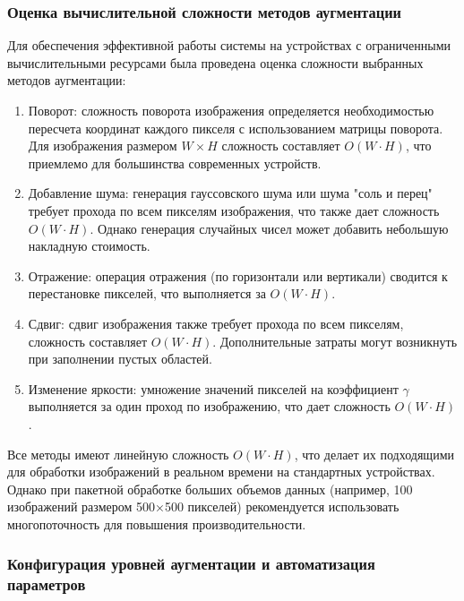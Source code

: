

\subsubsection{Оценка вычислительной сложности методов аугментации}

Для обеспечения эффективной работы системы на устройствах с ограниченными вычислительными ресурсами была проведена оценка сложности выбранных методов аугментации:

\begin{enumerate}
	\item Поворот: сложность поворота изображения определяется необходимостью пересчета координат каждого пикселя с использованием матрицы поворота. Для изображения размером $W \times H$ сложность составляет $O(W \cdot H)$, что приемлемо для большинства современных устройств.
	\item Добавление шума: генерация гауссовского шума или шума "соль и перец" требует прохода по всем пикселям изображения, что также дает сложность $O(W \cdot H)$. Однако генерация случайных чисел может добавить небольшую накладную стоимость.
	\item Отражение: операция отражения (по горизонтали или вертикали) сводится к перестановке пикселей, что выполняется за $O(W \cdot H)$.
	\item Сдвиг: сдвиг изображения также требует прохода по всем пикселям, сложность составляет $O(W \cdot H)$. Дополнительные затраты могут возникнуть при заполнении пустых областей.
	\item Изменение яркости: умножение значений пикселей на коэффициент $\gamma$ выполняется за один проход по изображению, что дает сложность $O(W \cdot H)$.
\end{enumerate}

Все методы имеют линейную сложность $O(W \cdot H)$, что делает их подходящими для обработки изображений в реальном времени на стандартных устройствах. Однако при пакетной обработке больших объемов данных (например, 100 изображений размером 500×500 пикселей) рекомендуется использовать многопоточность для повышения производительности.

\subsubsection{Конфигурация уровней аугментации и автоматизация параметров}

